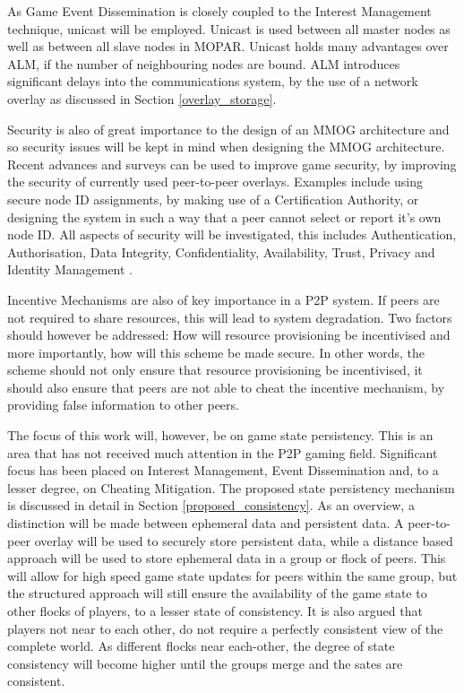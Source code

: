 \documentclass[journal,oneside,a4paper,onecolumn]{IEEEtran}
\begin{document}
As Game Event Dissemination is closely coupled to the Interest Management technique, unicast will be employed. Unicast is used between all master nodes as well as between all slave nodes in MOPAR. Unicast holds many advantages over ALM, if the number of neighbouring nodes are bound. ALM introduces significant delays into the communications system, by the use of a network overlay as discussed in Section \ref{overlay_storage}.

Security is also of great importance to the design of an MMOG architecture and so security issues will be kept in mind when designing the MMOG architecture. Recent advances and surveys can be used to improve game security, by improving the security of currently used peer-to-peer overlays. Examples include using secure node ID assignments, by making use of a Certification Authority, or designing the system in such a way that a peer cannot select or report it's own node ID. All aspects of security will be investigated, this includes Authentication, Authorisation, Data Integrity, Confidentiality, Availability, Trust, Privacy and Identity Management \cite{distributed_systems_security}.

Incentive Mechanisms are also of key importance in a P2P system. If peers are not required to share resources, this will lead to system degradation. Two factors should however be addressed: How will resource provisioning be incentivised and more importantly, how will this scheme be made secure. In other words, the scheme should not only ensure that resource provisioning be incentivised, it should also ensure that peers are not able to cheat the incentive mechanism, by providing false information to other peers.

The focus of this work will, however, be on game state persistency. This is an area that has not received much attention in the P2P gaming field. Significant focus has been placed on Interest Management, Event Dissemination and, to a lesser degree, on Cheating Mitigation. The proposed state persistency mechanism is discussed in detail in Section \ref{proposed_consistency}. As an overview, a distinction will be made between ephemeral data and persistent data. A peer-to-peer overlay will be used to securely store persistent data, while a distance based approach will be used to store ephemeral data in a group or flock of peers. This will allow for high speed game state updates for peers within the same group, but the structured approach will still ensure the availability of the game state to other flocks of players, to a lesser state of consistency. It is also argued that players not near to each other, do not require a perfectly consistent view of the complete world. As different flocks near each-other, the degree of state consistency will become higher until the groups merge and the sates are consistent.
\end{document}
